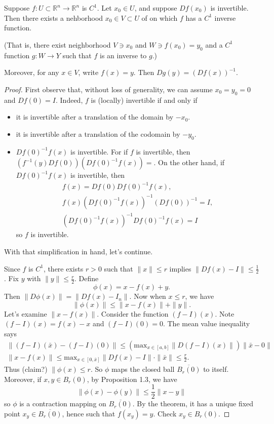 \documentclass[12pt]{article}
\begin{document}
\begin{theorem}
	Suppose $f:U\subset\mathbb{R}^n\to\mathbb{R}^n$ is $C^1$. Let $x_0\in U$, and suppose $Df(x_0)$ is invertible. Then there exists a nehborhood $x_0\in V\subset U$ of on which $f$ has a $C^1$ inverse function. 

	(That is, there exist neighborhood $V\ni x_0$ and $W\ni f(x_0)=y_0$ and a $C^1$ function $g:W\to Y$ such that $f$ is an inverse to $g$.)

	Moreover, for any $x\in V$, write $f(x)=y$. Then $Dg(y)=(Df(x))^{-1}$.
\end{theorem}
\begin{proof} 
	First observe that, without loss of generality, we can assume $x_0=y_0=0$ and $Df(0)=I$. Indeed, $f$ is (locally) invertible if and only if 
	\begin{itemize}
		\item it is invertible after a translation of the domain by $-x_0$.
		\item it is invertible after a translation of the codomain by $-y_0$.
		\item $Df(0)^{-1}f(x)$ is invertible. For if $f$ is invertible, then $(f^{-1}(y)Df(0))(Df(0)^{-1}f(x))=$. On the other hand, if $Df(0)^{-1}f(x)$ is invertible, then 
			\begin{gather*}
				f(x) = Df(0)Df(0)^{-1}f(x), \\
				f(x)(Df(0)^{-1}f(x))^{-1}(Df(0))^{-1} = I, \\
				(Df(0)^{-1}f(x))^{-1} Df(0)^{-1}f(x) = I
			\end{gather*}
			so $f$ is invertible.
	\end{itemize}
	With that simplification in hand, let's continue.

	Since $f$ is $C^1$, there exists $r>0$ such that $\|x\|\leq r$ implies $\|Df(x)-I\|\leq \frac{1}{2}$. Fix $y$ with $\|y\|\leq \frac{r}{2}$. Define 
	\begin{equation*}
		\phi(x) = x - f(x) + y.
	\end{equation*}
	Then $\|D\phi(x)\| = \|Df(x)-I_n\|$. Now when $x\leq r$, we have 
	\begin{equation*}
		\|\phi(x)\| \leq \|x-f(x)\| + \|y\|. \tag{$\ast$}
	\end{equation*}
	Let's examine $\|x-f(x)\|$. Consider the function $(f-I)(x)$. Note $(f-I)(x)=f(x)-x$ and $(f-I)(0)=0$. The mean value inequality says 
	\begin{gather*}
		\|(f-I)(\bar{x}) - (f-I)(0)\| \leq \left( \text{max}_{x\in [a,b]} \|D(f-I)(x)\| \right) \|\bar{x}-0\| \\
		\|x-f(x)\| \leq \text{max}_{x\in [0,\bar{x}]}\|Df(x)-I\|\cdot \|\bar{x}\| \leq \frac{r}{2}.
	\end{gather*}
	Thus (claim?) $\|\phi(x)\leq r$. So $\phi$ maps the closed ball $\overline{B_r(0)}$ to itself. Moreover, if $x,y\in B_r(0)$, by Proposition 1.3, we have 
	\begin{equation*}
		\|\phi(x)-\phi(y)\|\leq\frac{1}{2}\|x-y\|
	\end{equation*}
	so $\phi$ is a contraction mapping on $\overline{B_r(0)}$. By the theorem, it has a unique fixed point $x_y\in\overline{B_r(0)}$, hence such that $f(x_y)=y$. Check $x_y\in B_r(0)$.


\end{proof}
\end{document}
